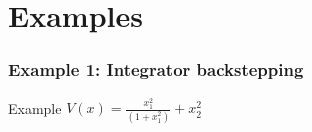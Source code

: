 \documentclass[]{beamer}
\begin{document}
\section{Examples}
\begin{frame}[t]
	\frametitle{Example 1: Integrator backstepping}
	
	\begin{exampleblock}{Example}
		$\displaystyle V(x) =\frac{x_1^2}{(1 + x_1^2)} + x_2^2$
		
		
	\end{exampleblock}
\end{frame}



	
	
\end{document}
